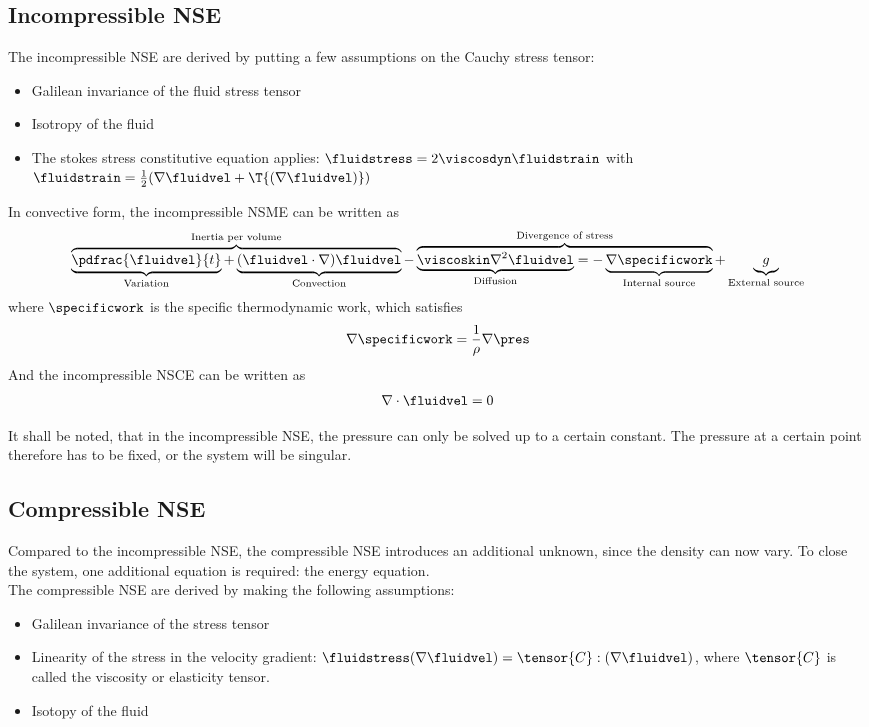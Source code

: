\documentclass[../main.tex]{subfiles}
\begin{document}
\subsection{Incompressible \acl{NSE}}
The incompressible \acf{NSE} are derived by putting a few assumptions on the Cauchy stress tensor:
\begin{itemize}
\item Galilean invariance of the fluid stress tensor
\item Isotropy of the fluid
\item The stokes stress constitutive equation applies: $\fluidstress=2 \viscosdyn \fluidstrain$ with $\fluidstrain=\frac{1}{2}(\nabla \fluidvel+\T{(\nabla \fluidvel)})$
\end{itemize}

In convective form, the incompressible \ac{NSME} can be written as
\begin{align}\label{eq:nsg_incompressible}
\overbrace{
           \underbrace{\pdfrac{\fluidvel}{t}}_{\text{Variation}}  +
          \underbrace{(\fluidvel\cdot\nabla)\fluidvel}_{\text{Convection}}
          }^{\text{Inertia per volume}}
 -
\overbrace{
           \underbrace{\viscoskin\nabla^2\fluidvel}_{\text{Diffusion}} =
          -\underbrace{\nabla\specificwork}_{\text{Internal source}}
          }^{\text{Divergence of stress}}
+
\underbrace{g}_{\text{External source}}
\end{align}
where $\specificwork$ is the specific thermodynamic work, which satisfies
\begin{align}
\nabla\specificwork =
\frac{1}{\rho}\nabla\pres
\end{align}
And the incompressible \ac{NSCE} can be written as
\begin{align}
\nabla\cdot\fluidvel=0
\end{align}

It shall be noted, that in the incompressible \ac{NSE}, the pressure can only be solved up to a certain constant. The pressure at a certain point therefore has to be fixed, or the system will be singular.


\subsection{Compressible \acl{NSE}}\label{sec:nsg_compressible}
Compared to the incompressible \acf{NSE}, the compressible \ac{NSE} introduces an additional unknown, since the density can now vary. To close the system, one additional equation is required: the energy equation.\\
The compressible \ac{NSE} are derived by making the following assumptions:
\begin{itemize}
\item Galilean invariance of the stress tensor
\item Linearity of the stress in the velocity gradient: $\fluidstress(\nabla\fluidvel)=\tensor{C}:(\nabla\fluidvel)$, where $\tensor{C}$ is called the viscosity or elasticity tensor.
\item Isotopy of the fluid
\end{itemize}
\end{document}
